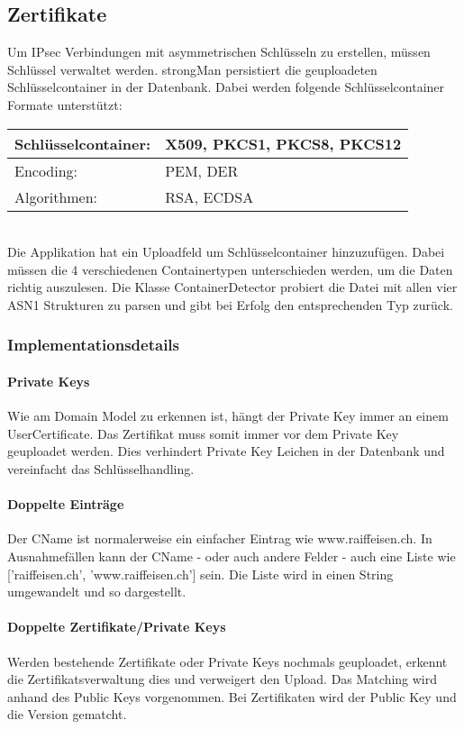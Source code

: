 \subsection{Zertifikate}
Um IPsec Verbindungen mit asymmetrischen Schlüsseln zu erstellen, müssen Schlüssel verwaltet werden. strongMan persistiert die geuploadeten Schlüsselcontainer in der Datenbank.
Dabei werden folgende Schlüsselcontainer Formate unterstützt: \\

\begin{tabular}{ | p{} | p{} | }
\hline
Schlüsselcontainer: & X509, PKCS1, PKCS8, PKCS12 \\
\hline
Encoding: & PEM, DER \\
\hline
Algorithmen: & RSA, ECDSA \\
\hline
\end{tabular}\\

Die Applikation hat ein Uploadfeld um Schlüsselcontainer hinzuzufügen. Dabei müssen die 4 verschiedenen Containertypen unterschieden werden, um die Daten richtig auszulesen. Die Klasse ContainerDetector probiert die Datei mit allen vier ASN1 Strukturen zu parsen und gibt bei Erfolg den entsprechenden Typ zurück.

\subsubsection{Implementationsdetails}
\paragraph{Private Keys} Wie am Domain Model zu erkennen ist, hängt der Private Key immer an einem UserCertificate. Das Zertifikat muss somit immer vor dem Private Key geuploadet werden. Dies verhindert Private Key Leichen in der Datenbank und vereinfacht das Schlüsselhandling.

\paragraph{Doppelte Einträge} Der CName ist normalerweise ein einfacher Eintrag wie www.raiffeisen.ch. In Ausnahmefällen kann der CName - oder auch andere Felder - auch eine Liste wie ['raiffeisen.ch', 'www.raiffeisen.ch'] sein. Die Liste wird in einen String umgewandelt und so dargestellt.

\paragraph{Doppelte Zertifikate/Private Keys}
Werden bestehende Zertifikate oder Private Keys nochmals geuploadet, erkennt die Zertifikatsverwaltung dies und verweigert den Upload. Das Matching wird anhand des Public Keys vorgenommen. Bei Zertifikaten wird der Public Key und die Version gematcht.




